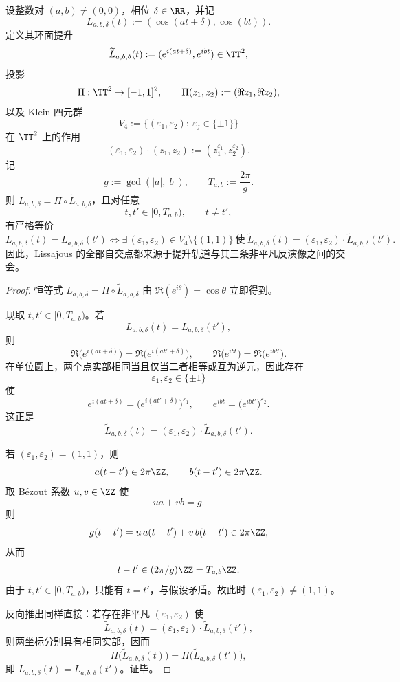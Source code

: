 \begin{proposition}\label{prop:xi-time-part62d-lissajous-klein-orbit-intersection}
设整数对 \((a,b)\neq (0,0)\)，相位 \(\delta\in\RR\)，并记
\[
L_{a,b,\delta}(t):=(\cos(at+\delta),\cos(bt)).
\]
定义其环面提升
\[
\widetilde L_{a,b,\delta}(t):=(e^{i(at+\delta)},e^{ibt})\in\TT^2,
\]
投影
\[
\Pi:\TT^2\to[-1,1]^2,
\qquad
\Pi(z_1,z_2):=(\Re z_1,\Re z_2),
\]
以及 Klein 四元群
\[
V_4:=\{(\varepsilon_1,\varepsilon_2):\ \varepsilon_j\in\{\pm 1\}\}
\]
在 \(\TT^2\) 上的作用
\[
(\varepsilon_1,\varepsilon_2)\cdot(z_1,z_2):=(z_1^{\varepsilon_1},z_2^{\varepsilon_2}).
\]
记
\[
g:=\gcd(|a|,|b|),
\qquad
T_{a,b}:=\frac{2\pi}{g}.
\]
则 \(L_{a,b,\delta}=\Pi\circ \widetilde L_{a,b,\delta}\)，且对任意
\[
t,t'\in[0,T_{a,b}),
\qquad
t\neq t',
\]
有严格等价
\[
L_{a,b,\delta}(t)=L_{a,b,\delta}(t')
\iff
\exists\,(\varepsilon_1,\varepsilon_2)\in V_4\setminus\{(1,1)\}
\ \text{使}\ 
\widetilde L_{a,b,\delta}(t)
=
(\varepsilon_1,\varepsilon_2)\cdot
\widetilde L_{a,b,\delta}(t').
\]
因此，Lissajous 的全部自交点都来源于提升轨道与其三条非平凡反演像之间的交会。
\end{proposition}
\begin{proof}
恒等式 \(L_{a,b,\delta}=\Pi\circ \widetilde L_{a,b,\delta}\) 由 \(\Re(e^{i\theta})=\cos\theta\) 立即得到。

现取 \(t,t'\in[0,T_{a,b})\)。若
\[
L_{a,b,\delta}(t)=L_{a,b,\delta}(t'),
\]
则
\[
\Re\bigl(e^{i(at+\delta)}\bigr)=\Re\bigl(e^{i(at'+\delta)}\bigr),
\qquad
\Re\bigl(e^{ibt}\bigr)=\Re\bigl(e^{ibt'}\bigr).
\]
在单位圆上，两个点实部相同当且仅当二者相等或互为逆元，因此存在
\[
\varepsilon_1,\varepsilon_2\in\{\pm1\}
\]
使
\[
e^{i(at+\delta)}=\bigl(e^{i(at'+\delta)}\bigr)^{\varepsilon_1},
\qquad
e^{ibt}=\bigl(e^{ibt'}\bigr)^{\varepsilon_2}.
\]
这正是
\[
\widetilde L_{a,b,\delta}(t)
=
(\varepsilon_1,\varepsilon_2)\cdot
\widetilde L_{a,b,\delta}(t').
\]

若 \((\varepsilon_1,\varepsilon_2)=(1,1)\)，则
\[
 a(t-t')\in 2\pi\ZZ,
\qquad
 b(t-t')\in 2\pi\ZZ.
\]
取 Bézout 系数 \(u,v\in\ZZ\) 使
\[
ua+vb=g.
\]
则
\[
g(t-t')=u\,a(t-t')+v\,b(t-t')\in 2\pi\ZZ,
\]
从而
\[
t-t'\in (2\pi/g)\ZZ=T_{a,b}\ZZ.
\]
由于 \(t,t'\in[0,T_{a,b})\)，只能有 \(t=t'\)，与假设矛盾。故此时 \((\varepsilon_1,\varepsilon_2)\neq (1,1)\)。

反向推出同样直接：若存在非平凡 \((\varepsilon_1,\varepsilon_2)\) 使
\[
\widetilde L_{a,b,\delta}(t)
=
(\varepsilon_1,\varepsilon_2)\cdot
\widetilde L_{a,b,\delta}(t'),
\]
则两坐标分别具有相同实部，因而
\[
\Pi\bigl(\widetilde L_{a,b,\delta}(t)\bigr)
=
\Pi\bigl(\widetilde L_{a,b,\delta}(t')\bigr),
\]
即 \(L_{a,b,\delta}(t)=L_{a,b,\delta}(t')\)。证毕。
\end{proof}

